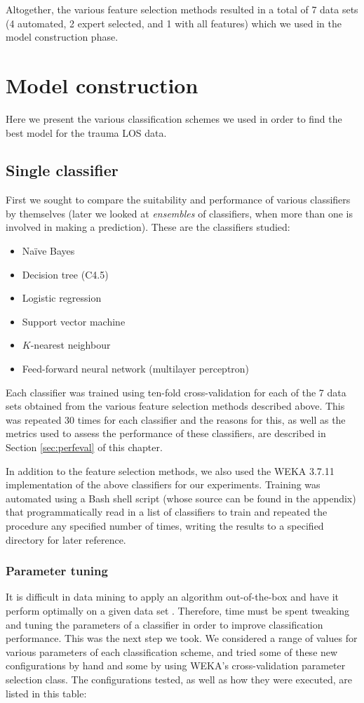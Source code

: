 Altogether, the various feature selection methods resulted in a total of
7 data sets (4 automated, 2 expert selected, and 1 with all features) which
we used in the model construction phase.

\section{Model construction}
Here we present the various classification schemes we used in order to find
the best model for the trauma LOS data.

\subsection{Single classifier}
First we sought to compare the suitability and performance of various
classifiers by themselves (later we looked at \textit{ensembles} of
classifiers, when more than one is involved in making a prediction).
These are the
classifiers studied: 
\begin{itemize}
\item Na\"{i}ve Bayes
\item Decision tree (C4.5)
\item Logistic regression
\item Support vector machine
\item $K$-nearest neighbour
\item Feed-forward neural network (multilayer perceptron)
\end{itemize}

Each classifier was trained using ten-fold cross-validation for each of the
7 data sets obtained from the various feature selection methods described
above. This was repeated 30 times for each classifier and the reasons for
this, as well as the metrics used to assess the performance of these
classifiers, are described in Section \ref{sec:perfeval} of this chapter.

In addition to the feature selection methods, we also used the WEKA 3.7.11
\citep{Hall2009} implementation of the above classifiers for our experiments.
Training was automated using a Bash shell script (whose source can be found
in the appendix) that programmatically read in a list of classifiers to
train and repeated the procedure any specified number of times, writing the
results to a specified directory for later reference.

\subsubsection{Parameter tuning}
It is difficult in data mining to apply an algorithm out-of-the-box and have
it perform optimally on a given data set \citep{Witten2005}. Therefore, time
must be spent tweaking and tuning the parameters of a classifier in order to
improve classification performance. This was the next step we took. We
considered a range of values for various parameters of each classification
scheme, and tried some of these new configurations by hand and some by using
WEKA's cross-validation parameter selection class. The configurations tested,
as well as how they were executed, are listed in this table:

